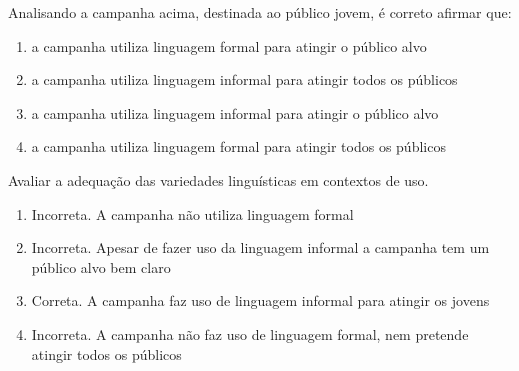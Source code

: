 Analisando a campanha acima, destinada ao público jovem, é correto
afirmar que:

\begin{enumerate}
\def\labelenumi{\alph{enumi})}
\item
  a campanha utiliza linguagem formal para atingir o público alvo
\item
  a campanha utiliza linguagem informal para atingir todos os públicos
\item
  a campanha utiliza linguagem informal para atingir o público alvo
\item
  a campanha utiliza linguagem formal para atingir todos os públicos
\end{enumerate}

Avaliar a adequação das variedades linguísticas em contextos de uso.

\begin{enumerate}
\def\labelenumi{\arabic{enumi}.}
\item
  Incorreta. A campanha não utiliza linguagem formal
\item
  Incorreta. Apesar de fazer uso da linguagem informal a campanha tem um
  público alvo bem claro
\item
  Correta. A campanha faz uso de linguagem informal para atingir os
  jovens
\item
  Incorreta. A campanha não faz uso de linguagem formal, nem pretende
  atingir todos os públicos
\end{enumerate}
